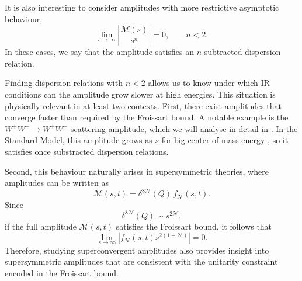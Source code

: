 It is also interesting to consider amplitudes with more restrictive asymptotic behaviour,
\begin{equation}
\lim_{s \to \infty} \left|\frac{\mathcal{M}(s)}{s^{n}}\right| = 0, \qquad n < 2.
\end{equation}
In these cases, we say that the amplitude satisfies an $n$-subtracted dispersion relation.

Finding  dispersion relations with $n<2$ allows us to know under which IR conditions can the amplitude grow slower at high energies.
This situation is physically relevant in at least two contexts. 
First, there exist amplitudes that converge faster than required by the Froissart bound. A notable example is the $W^+ W^- \to W^+ W^-$ scattering amplitude, which we will analyse in detail in . In the Standard Model, this amplitude grows as $s$ for big center-of-mass energy \autocite{Schwartz:2014sze}, so it satisfies once substracted dispersion relations.

Second, this behaviour naturally arises in supersymmetric theories, where amplitudes can be written as
\begin{equation}
\mathcal{M}(s,t) = \delta^{8\mathcal{N}}(Q)\, f_{\mathcal{N}}(s,t).
\end{equation}
Since
\begin{equation}
\delta^{8\mathcal{N}}(Q) \sim s^{2\mathcal{N}},
\end{equation}
if the full amplitude $\mathcal{M}(s,t)$ satisfies the Froissart bound, it follows that \autocite{Huang:2025icl}
\begin{equation}
\lim_{s \to \infty} \left| f_{\mathcal{N}}(s,t) s^{2(1-\mathcal{N})} \right| = 0.
\end{equation}
Therefore, studying superconvergent amplitudes also provides insight into supersymmetric amplitudes that are consistent with the unitarity constraint encoded in the Froissart bound.
